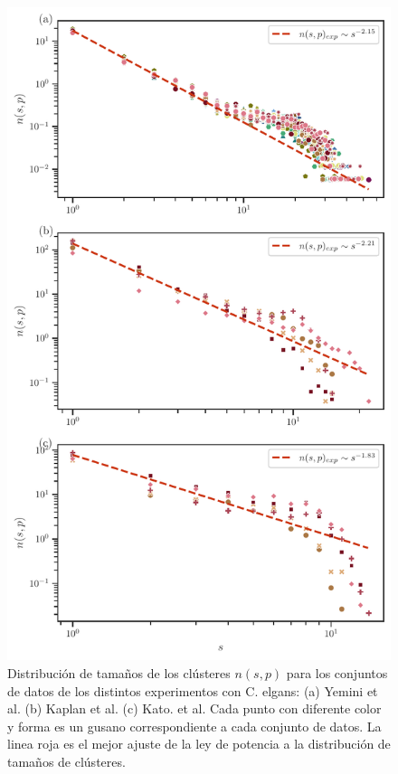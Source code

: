 \begin{figure}[h!]
	\centering\includegraphics[width=\imsize]{ley_potencia_experimentos.pdf}
	\caption[Distribución de tamaños de los clústeres $n(s,p)$ para los conjuntos de datos de los distintos experimentos con C. elgans: (a) Yemini et al. (b) Kaplan et al. (c) Kato. et al. ]{Distribución de tamaños de los clústeres $n(s,p)$ para los conjuntos de datos de los distintos experimentos con C. elgans: (a) Yemini et al. (b) Kaplan et al. (c) Kato. et al. Cada punto con diferente color y forma es un gusano correspondiente a cada conjunto de datos.  La linea roja  es el mejor ajuste de la ley de potencia a la distribución de tamaños de clústeres. } \label{fig:ley_potencia_experimentos}
\end{figure}

